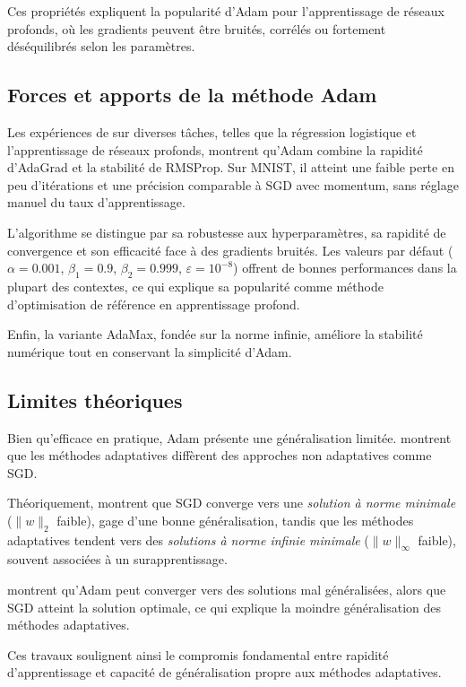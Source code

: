 \documentclass[a4paper,12pt]{article}
\begin{document}
Ces propriétés expliquent la popularité d’Adam pour l’apprentissage de
réseaux profonds, où les gradients peuvent être bruités, corrélés ou
fortement déséquilibrés selon les paramètres.

\subsection{Forces et apports de la méthode Adam}

Les expériences de \cite{kingma2014} sur diverses tâches, telles que
la régression logistique et l’apprentissage de réseaux profonds,
montrent qu’Adam combine la rapidité d’AdaGrad et la stabilité
de RMSProp. Sur MNIST, il atteint une faible perte en peu d’itérations
et une précision comparable à SGD avec momentum, sans réglage manuel du
taux d’apprentissage.

L’algorithme se distingue par sa robustesse aux hyperparamètres, sa rapidité de convergence et son efficacité face à des gradients bruités. Les valeurs par défaut
($\alpha\!=\!0.001$, $\beta_1\!=\!0.9$, $\beta_2\!=\!0.999$,
$\varepsilon\!=\!10^{-8}$) offrent de bonnes performances dans la
plupart des contextes, ce qui explique sa popularité comme méthode
d’optimisation de référence en apprentissage profond.

Enfin, la variante AdaMax, fondée sur la norme infinie, améliore la stabilité numérique tout en conservant la simplicité d’Adam.

\subsection{Limites théoriques}

Bien qu’efficace en pratique, Adam présente une généralisation
limitée. \cite{wilson2017} montrent que les méthodes adaptatives
diffèrent des approches non adaptatives comme SGD.

Théoriquement, \cite{wilson2017} montrent que SGD converge vers une
\emph{solution à norme minimale} ($\|w\|_2$ faible), gage d’une bonne
généralisation, tandis que les méthodes adaptatives tendent vers des
\emph{solutions à norme infinie minimale} ($\|w\|_\infty$ faible),
souvent associées à un surapprentissage.

\cite{wilson2017} montrent qu’Adam peut converger vers des solutions
mal généralisées, alors que SGD atteint la solution optimale, ce qui
explique la moindre généralisation des méthodes adaptatives.

Ces travaux soulignent ainsi le compromis fondamental entre rapidité d’apprentissage et capacité de généralisation propre aux méthodes adaptatives.
\end{document}
